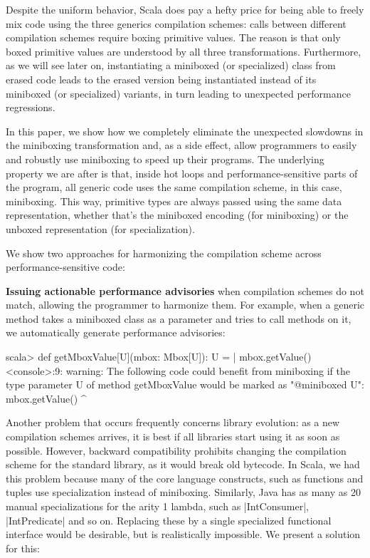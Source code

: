 Despite the uniform behavior, Scala does pay a hefty price for being able to freely mix code using the three generics compilation schemes: calls between different compilation schemes require boxing primitive values. The reason is that only boxed primitive values are understood by all three transformations. Furthermore, as we will see later on, instantiating a miniboxed (or specialized) class from erased code leads to the erased version being instantiated instead of its miniboxed (or specialized) variants, in turn leading to unexpected performance regressions.

In this paper, we show how we completely eliminate the unexpected slowdowns in the miniboxing transformation and, as a side effect, allow programmers to easily and robustly use miniboxing to speed up their programs. The underlying property we are after is that, inside hot loops and performance-sensitive parts of the program, all generic code uses the same compilation scheme, in this case, miniboxing. This way, primitive types are always passed using the same data representation, whether that's the miniboxed encoding (for miniboxing) or the unboxed representation (for specialization).

We show two approaches for harmonizing the compilation scheme across performance-sensitive code:

\textbf{Issuing actionable performance advisories} when compilation schemes do not match, allowing the programmer to harmonize them. For example, when a generic method takes a miniboxed class as a parameter and tries to call methods on it, we automatically generate performance advisories:

\begin{lstlisting-nobreak-nolang}
scala> def getMboxValue[U](mbox: Mbox[U]): U =
     |      mbox.getValue()
<console>:9: warning: The following code could benefit from miniboxing if the type parameter U of method getMboxValue would be marked as "@miniboxed U":
         mbox.getValue()
               ^
\end{lstlisting-nobreak-nolang}

Another problem that occurs frequently concerns library evolution: as a new compilation schemes arrives, it is best if all libraries start using it as soon as possible. However, backward compatibility prohibits changing the compilation scheme for the standard library, as it would break old bytecode. In Scala, we had this problem because many of the core language constructs, such as functions and tuples use specialization instead of miniboxing. Similarly, Java has as many as 20 manual specializations for the arity 1 lambda, such as |IntConsumer|, |IntPredicate| and so on. Replacing these by a single specialized functional interface would be desirable, but is realistically impossible. We present a solution for this:

